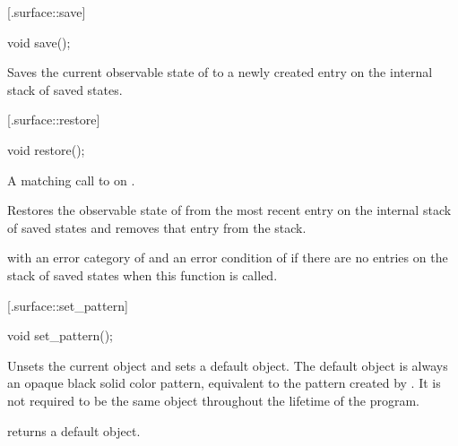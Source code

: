  [\iotwod.surface::save] {}

%
%
\begin{itemdecl}
void save();
\end{itemdecl}
\begin{itemdescr}
	\pnum
	\effects
	Saves the current observable state of  to a newly created entry on the internal stack of saved states.
\end{itemdescr}

 [\iotwod.surface::restore] {}

%
%
\begin{itemdecl}
void restore();
\end{itemdecl}
\begin{itemdescr}
	\pnum
	\requires
	A matching call to  on .
	
	\pnum
	\effects
	Restores the observable state of  from the most recent entry on the internal stack of saved states and removes that entry from the stack.
	
	\pnum
	\throws
	 with an error category of  and an error condition of  if there are no entries on the stack of saved states when this function is called.
\end{itemdescr}

 [\iotwod.surface::set_pattern] {}

%
%
\begin{itemdecl}
void set_pattern();
\end{itemdecl}
\begin{itemdescr}
	\pnum
	\effects
	Unsets the current  object and sets a default  object.
	\enternote
	The default  object is always an opaque black solid color 
	pattern, equivalent to the pattern created by 
	. It is 
	not required to be the same object throughout the lifetime of the program.
	\exitnote
	
	\pnum
	\postconditions
	 returns a default  object.
\end{itemdescr}


